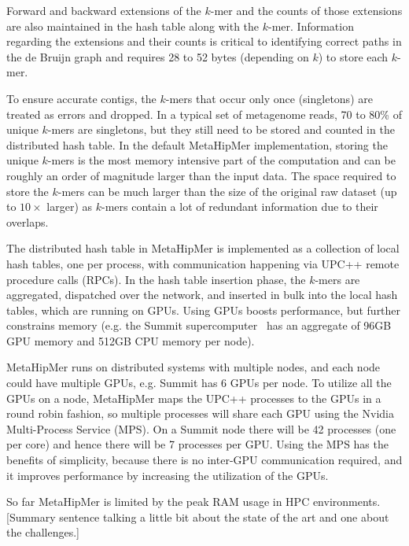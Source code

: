Forward and backward extensions of the $k$-mer and the counts of those
extensions are also maintained in the hash table along with the $k$-mer.
Information regarding the extensions and their counts is critical to identifying
correct paths in the de Bruijn graph and requires 28 to 52 bytes (depending on
$k$) to store each $k$-mer.

To ensure accurate contigs, the $k$-mers that occur only once (singletons) are
treated as errors and dropped. In a typical set of metagenome reads, 70 to 80\%
of unique $k$-mers are singletons, but they still need to be stored and counted
in the distributed hash table. In the default MetaHipMer implementation, storing
the unique $k$-mers is the most memory intensive part of the computation and can
be roughly an order of magnitude larger than the input data.  The space required
to store the $k$-mers can be much larger than the size of the original raw
dataset (up to $10\times$ larger) as $k$-mers contain a lot of redundant
information due to their overlaps.

The distributed hash table in MetaHipMer is implemented as a collection of local
hash tables, one per process, with communication happening via UPC++ remote
procedure calls (RPCs). In the hash table insertion phase, the $k$-mers are
aggregated, dispatched over the network, and inserted in bulk into the local
hash tables, which are running on GPUs. Using GPUs boosts performance, but
further constrains memory (e.g. the Summit supercomputer~\cite{VazhkudaiDBG18}
has an aggregate of 96GB GPU memory and 512GB CPU memory per node).

MetaHipMer runs on distributed systems with multiple nodes, and each node could
have multiple GPUs, e.g. Summit has 6 GPUs per node. To utilize all the GPUs on
a node, MetaHipMer maps the UPC++ processes to the GPUs in a round robin
fashion, so multiple processes will share each GPU using the Nvidia
Multi-Process Service (MPS). On a Summit node there will be 42 processes (one
per core) and hence there will be 7 processes per GPU\@. Using the MPS has the
benefits of simplicity, because there is no inter-GPU communication required,
and it improves performance by increasing the utilization of the GPUs.

\begin{rproblem}
So far MetaHipMer is limited by the peak RAM usage in HPC environments.
[Summary sentence talking a little bit about the state of the art and one about the challenges.]
\label{rprob:peppermint}
\end{rproblem}



